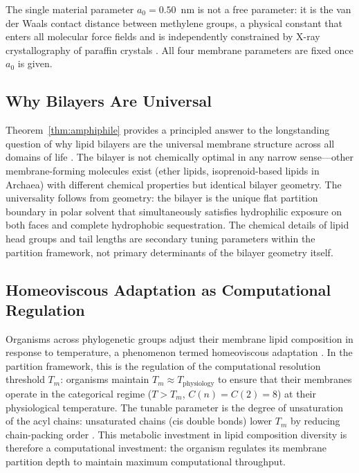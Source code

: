 \documentclass[11pt,twocolumn,a4paper]{article}
\theoremstyle{definition}
\theoremstyle{remark}
\begin{document}
The single material parameter $a_0 = 0.50$~nm is not a free parameter:
it is the van der Waals contact distance between methylene groups, a
physical constant that enters all molecular force fields and is
independently constrained by X-ray crystallography of paraffin
crystals \citep{israelachvili1991}. All four membrane parameters
are fixed once $a_0$ is given.

\subsection{Why Bilayers Are Universal}

Theorem~\ref{thm:amphiphile} provides a principled answer to the
longstanding question of why lipid bilayers are the universal membrane
structure across all domains of life \citep{pereto2004}. The bilayer
is not chemically optimal in any narrow sense---other membrane-forming
molecules exist (ether lipids, isoprenoid-based lipids in Archaea)
with different chemical properties but identical bilayer geometry.
The universality follows from geometry: the bilayer is the unique
flat partition boundary in polar solvent that simultaneously satisfies
hydrophilic exposure on both faces and complete hydrophobic sequestration.
The chemical details of lipid head groups and tail lengths are secondary
tuning parameters within the partition framework, not primary determinants
of the bilayer geometry itself.

\subsection{Homeoviscous Adaptation as Computational Regulation}

Organisms across phylogenetic groups adjust their membrane lipid composition
in response to temperature, a phenomenon termed homeoviscous adaptation
\citep{sinensky1974}. In the partition framework, this is the regulation
of the computational resolution threshold $T_m$: organisms maintain
$T_m \approx T_{\text{physiology}}$ to ensure that their membranes operate
in the categorical regime ($T > T_m$, $C(n) = C(2) = 8$) at their
physiological temperature. The tunable parameter is the degree of
unsaturation of the acyl chains: unsaturated chains (cis double bonds)
lower $T_m$ by reducing chain-packing order \citep{bloom1991, rawicz2000}.
This metabolic investment in lipid composition diversity is therefore a
computational investment: the organism regulates its membrane partition
depth to maintain maximum computational throughput.
\end{document}
